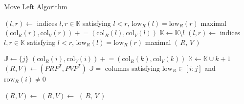 \documentclass{siamart190516}
\begin{document}
\begin{algorithm}[!htb]
	\caption{Move Left Algorithm}\label{alg:ml}
    \begin{algorithmic}[1]
            \State $(l, r) \gets $ indices $l, r \in \mathbb{K}$ satisfying $l < r$, $\mathrm{low}_R(l) = \mathrm{low}_R(r)$ maximal 
            	\State $(\mathrm{col}_R(r), \mathrm{col}_V(r)) \mathrel{+}= (\mathrm{col}_R(l), \mathrm{col}_V(l))$
            	\State $\mathbb{K} \gets \mathbb{K} \setminus l$
            	\State $(l, r) \gets $ indices $l, r \in \mathbb{K}$ satisfying $l < r$, $\mathrm{low}_R(l) = \mathrm{low}_R(r)$ maximal
            \EndWhile
        	\State \Return $(\, R, \, V \, )$
        \EndFunction
    \end{algorithmic}
    
    \begin{algorithmic}[1]
        	\State $\mathbb{J} \gets \{ j \}$
            	\State $(\mathrm{col}_R(i), \mathrm{col}_V(i)) \mathrel{+}= (\mathrm{col}_R(k), \mathrm{col}_V(k))$
            	\State $\mathbb{K} \gets \mathbb{K} \cup k + 1 $
            \EndWhile
            \State $(R, V) \gets (P R P^T, P V P^T)$
            \State $\mathbb{J} = $ columns satisfying $\mathrm{low}_R \in [i:j]$ and $\mathrm{row}_R(i) \neq 0$ %

            \State $(R, V) \gets$ 
            \State $(R, V) \gets$ 
			\State \Return $(\, R, \, V\,)$
        \EndFunction
    \end{algorithmic}

\end{algorithm}
\end{document}
